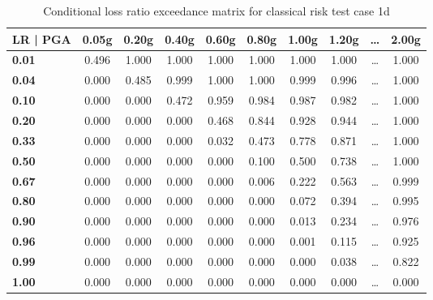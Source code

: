 \begin{table}[htbp]

\centering
\begin{tabular}{ l c c c c c c c c c }

\hline
\rowcolor{anti-flashwhite}
\bf{LR | PGA} & \bf{0.05g} & \bf{0.20g} & \bf{0.40g} & \bf{0.60g} & \bf{0.80g} & \bf{1.00g} & \bf{1.20g} & \bf{\dots} & \bf{2.00g} \\
\hline
\bf{0.01} & 0.496 & 1.000 & 1.000 & 1.000 & 1.000 & 1.000 & 1.000 & \dots & 1.000 \\
\bf{0.04} & 0.000 & 0.485 & 0.999 & 1.000 & 1.000 & 0.999 & 0.996 & \dots & 1.000 \\
\bf{0.10} & 0.000 & 0.000 & 0.472 & 0.959 & 0.984 & 0.987 & 0.982 & \dots & 1.000 \\
\bf{0.20} & 0.000 & 0.000 & 0.000 & 0.468 & 0.844 & 0.928 & 0.944 & \dots & 1.000 \\
\bf{0.33} & 0.000 & 0.000 & 0.000 & 0.032 & 0.473 & 0.778 & 0.871 & \dots & 1.000 \\
\bf{0.50} & 0.000 & 0.000 & 0.000 & 0.000 & 0.100 & 0.500 & 0.738 & \dots & 1.000 \\
\bf{0.67} & 0.000 & 0.000 & 0.000 & 0.000 & 0.006 & 0.222 & 0.563 & \dots & 0.999 \\
\bf{0.80} & 0.000 & 0.000 & 0.000 & 0.000 & 0.000 & 0.072 & 0.394 & \dots & 0.995 \\
\bf{0.90} & 0.000 & 0.000 & 0.000 & 0.000 & 0.000 & 0.013 & 0.234 & \dots & 0.976 \\
\bf{0.96} & 0.000 & 0.000 & 0.000 & 0.000 & 0.000 & 0.001 & 0.115 & \dots & 0.925 \\
\bf{0.99} & 0.000 & 0.000 & 0.000 & 0.000 & 0.000 & 0.000 & 0.038 & \dots & 0.822 \\
\bf{1.00} & 0.000 & 0.000 & 0.000 & 0.000 & 0.000 & 0.000 & 0.000 & \dots & 0.000 \\
\hline
\end{tabular}

\caption{Conditional loss ratio exceedance matrix for classical risk test case 1d}
\label{tab:lrem-bt-tax1-nzcov}
\end{table}